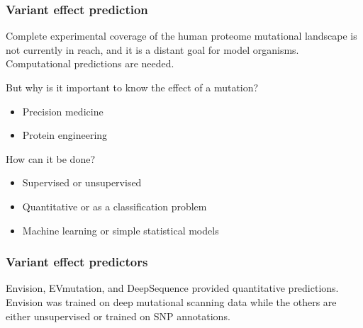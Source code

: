 \documentclass[10pt, british]{beamer}
\begin{document}
\begin{frame}
	\frametitle{Variant effect prediction}
	Complete experimental coverage of the human proteome mutational landscape is not currently in reach, and it is a distant goal for model organisms.
	Computational predictions are needed.

	But why is it important to know the effect of a mutation?

	\begin{itemize}
		\item Precision medicine
		\item Protein engineering
	\end{itemize}

	How can it be done?

	\begin{itemize}
		\item Supervised or unsupervised
		\item Quantitative or as a classification problem
		\item Machine learning or simple statistical models
	\end{itemize}
\end{frame}

\begin{frame}
	\frametitle{Variant effect predictors}
	\begin{figure}
	\end{figure}
	\vfill%
	Envision, EVmutation, and DeepSequence provided quantitative predictions.
	Envision was trained on deep mutational scanning data while the others are either unsupervised or trained on SNP annotations.
\end{frame}
\end{document}
